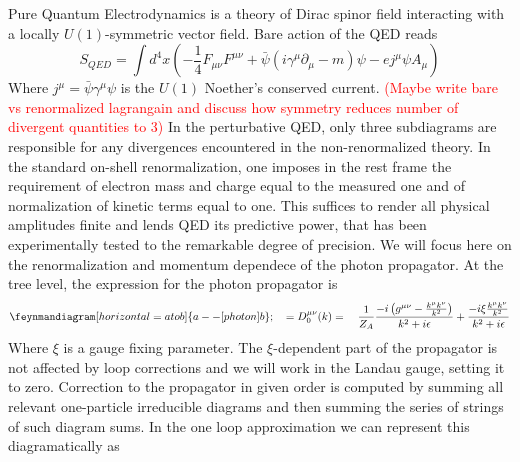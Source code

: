 \documentclass[11pt, a4paper]{article}
\begin{document}
Pure Quantum Electrodynamics is a theory of Dirac spinor field interacting with a locally $U(1)$-symmetric vector field.
Bare action of the QED reads
\begin{equation}
    S_{QED} = \int d^4 x \left( -\frac{1}{4}F_{\mu\nu}F^{\mu\nu} + \bar{\psi}(i \gamma^\mu \partial_\mu - m)\psi - e j^\mu \psi A_\mu \right)
\end{equation}
Where $j^\mu = \bar \psi \gamma^\mu \psi$ is the $U(1)$ Noether's conserved current.
\textcolor{red}{(Maybe write bare vs renormalized lagrangain and discuss how symmetry reduces number of divergent quantities to 3)}
In the perturbative QED, only three subdiagrams are responsible for any divergences encountered in the non-renormalized
theory. In the standard on-shell renormalization, one imposes in the rest frame the requirement of electron mass and charge
equal to the measured one and of normalization of kinetic terms equal to one. This suffices to render all
physical amplitudes finite and lends QED its predictive power, that has been experimentally tested
to the remarkable degree of precision.
We will focus here on the renormalization and momentum dependece of the photon propagator.
At the tree level, the expression for the photon propagator is
\begin{equation*}
\begin{aligned}
\feynmandiagram [horizontal=a to b] {
a -- [photon] b
}; \quad = D_0^{\mu\nu}(k) = \quad \frac{1}{Z_A} \frac{-i \left( g^{\mu\nu} - \frac{k^\mu k^\nu}{k^2} \right)}{k^2+i\epsilon} + \frac{-i \xi \frac{k^\mu k^\nu}{k^2}}{k^2+i\epsilon}
\end{aligned}
\end{equation*}
Where $\xi$ is a gauge fixing parameter. The $\xi$-dependent part of the propagator is not affected by loop corrections
and we will work in the Landau gauge, setting it to zero. 
Correction to the propagator in given order is computed by summing all relevant one-particle irreducible diagrams
and then summing the series of strings of such diagram sums. In the one loop approximation we can represent this diagramatically as
\end{document}
